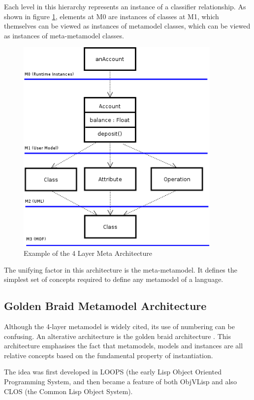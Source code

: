 Each level in this hierarchy represents an instance of a
classifier relationship. As shown in figure \ref{4layer}, elements
at M0 are instances of classes at M1, which themselves can be
viewed as instances of metamodel classes, which can be viewed as
instances of meta-metamodel classes.

\begin{figure}[htb]
\begin{center}
\includegraphics[width=10cm]{Metamodelling/figures/4layer.png}
\caption{Example of the 4 Layer Meta Architecture} \label{4layer}
\end{center}
\end{figure}


The unifying factor in this architecture is the meta-metamodel. It
defines the simplest set of concepts required to define any
metamodel of a language.

\subsection{Golden Braid Metamodel Architecture}
\label{goldenbraid}

Although the 4-layer metamodel is widely cited, its use of
numbering can be confusing. An alterative architecture is the
golden braid architecture \cite{escher}. This architecture
emphasises the fact that metamodels, models and instances are all
relative concepts based on the fundamental property of
instantiation.

The idea was first developed in LOOPS (the early Lisp Object
Oriented Programming System, and then became a feature of both
ObjVLisp \cite{objVlisp} and also CLOS (the Common Lisp Object
System).


